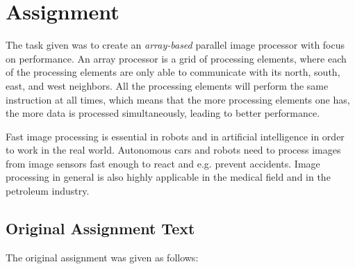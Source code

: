 \section{Assignment}
The task given was to create an {\em array-based} parallel image processor with
focus on performance. An array processor is a grid of processing elements, where
each of the processing elements are only able to communicate with its north,
south, east, and west neighbors. All the processing elements will perform the
same instruction at all times, which means that the more processing elements one
has, the more data is processed simultaneously, leading to better performance.

Fast image processing is essential in robots\cite{miller1989r-vision,
  thrun2007stanley} and in artificial intelligence\cite{hwang1989parallel} in
order to work in the real world. Autonomous cars and robots need to process
images from image sensors fast enough to react and e.g. prevent
accidents\cite{aufrere2003coll-avoid}. Image processing in general is also
highly applicable in the medical field\cite{luong2009medical-image,
  sternberg1983biomedical} and in the petroleum
industry\cite{ferrari2007steam-images}.

\subsection{Original Assignment Text}

The original assignment was given as follows:

